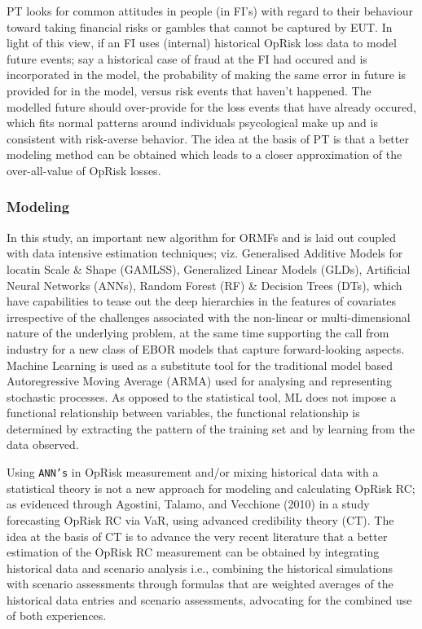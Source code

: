 \documentclass[]{DissertateUSU}
\begin{document}
PT looks for common attitudes in people (in FI's) with regard to their
behaviour toward taking financial risks or gambles that cannot be
captured by EUT. In light of this view, if an FI uses (internal)
historical OpRisk loss data to model future events; say a historical
case of fraud at the FI had occured and is incorporated in the model,
the probability of making the same error in future is provided for in
the model, versus risk events that haven't happened. The modelled future
should over-provide for the loss events that have already occured, which
fits normal patterns around individuals psycological make up and is
consistent with risk-averse behavior. The idea at the basis of PT is
that a better modeling method can be obtained which leads to a closer
approximation of the over-all-value of OpRisk losses.

\subsubsection{Modeling}

In this study, an important new algorithm for ORMFs and is laid out
coupled with data intensive estimation techniques; viz. Generalised
Additive Models for locatin Scale \& Shape (GAMLSS), Generalized Linear
Models (GLDs), Artificial Neural Networks (ANNs), Random Forest (RF) \&
Decision Trees (DTs), which have capabilities to tease out the deep
hierarchies in the features of covariates irrespective of the challenges
associated with the non-linear or multi-dimensional nature of the
underlying problem, at the same time supporting the call from industry
for a new class of EBOR models that capture forward-looking aspects.
Machine Learning is used as a substitute tool for the traditional model
based Autoregressive Moving Average (ARMA) used for analysing and
representing stochastic processes. As opposed to the statistical tool,
ML does not impose a functional relationship between variables, the
functional relationship is determined by extracting the pattern of the
training set and by learning from the data observed.\medskip 

Using \texttt{ANN's} in OpRisk measurement and/or mixing historical data
with a statistical theory is not a new approach for modeling and
calculating OpRisk RC; as evidenced through Agostini, Talamo, and
Vecchione (2010) in a study forecasting OpRisk RC via VaR, using
advanced credibility theory (CT). The idea at the basis of CT is to
advance the very recent literature that a better estimation of the
OpRisk RC measurement can be obtained by integrating historical data and
scenario analysis i.e., combining the historical simulations with
scenario assessments through formulas that are weighted averages of the
historical data entries and scenario assessments, advocating for the
combined use of both experiences.\medskip 
\end{document}
